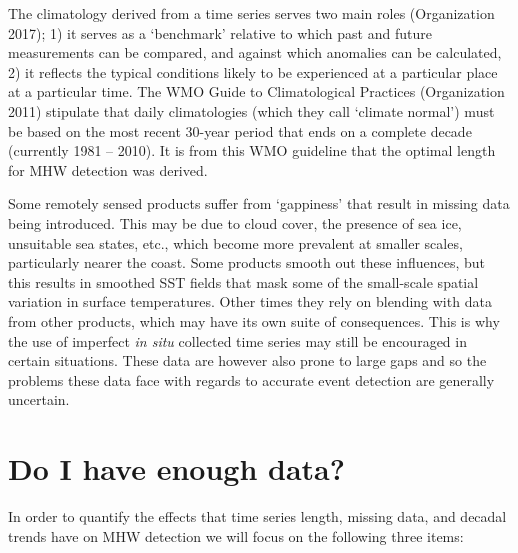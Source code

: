 \documentclass[]{article}
\begin{document}
The climatology derived from a time series serves two main roles
(Organization 2017); 1) it serves as a `benchmark' relative to which
past and future measurements can be compared, and against which
anomalies can be calculated, 2) it reflects the typical conditions
likely to be experienced at a particular place at a particular time. The
WMO Guide to Climatological Practices (Organization 2011) stipulate that
daily climatologies (which they call `climate normal') must be based on
the most recent 30-year period that ends on a complete decade (currently
1981 -- 2010). It is from this WMO guideline that the optimal length for
MHW detection was derived.

Some remotely sensed products suffer from `gappiness' that result in
missing data being introduced. This may be due to cloud cover, the
presence of sea ice, unsuitable sea states, etc., which become more
prevalent at smaller scales, particularly nearer the coast. Some
products smooth out these influences, but this results in smoothed SST
fields that mask some of the small-scale spatial variation in surface
temperatures. Other times they rely on blending with data from other
products, which may have its own suite of consequences. This is why the
use of imperfect \emph{in situ} collected time series may still be
encouraged in certain situations. These data are however also prone to
large gaps and so the problems these data face with regards to accurate
event detection are generally uncertain.

\hypertarget{do-i-have-enough-data}{%
\section{Do I have enough data?}\label{do-i-have-enough-data}}

In order to quantify the effects that time series length, missing data,
and decadal trends have on MHW detection we will focus on the following
three items:
\end{document}

